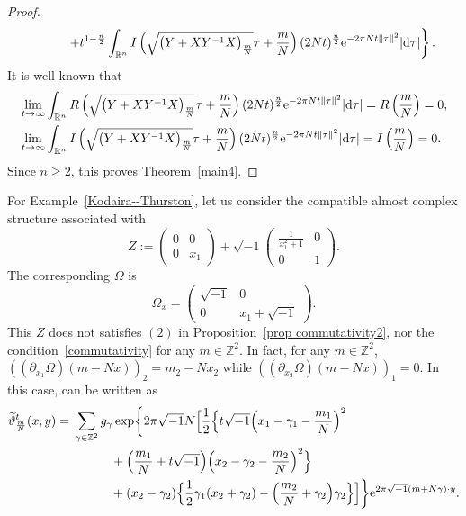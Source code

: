 \documentclass[10pt,a4paper]{amsart}
\numberwithin{equation}{section}
\newcommand{\R}{\mathbb{R}}
\newcommand{\Z}{\mathbb{Z}}
\renewcommand{\tilde}{\widetilde}
\newcommand{\abs}[1]{\lvert#1\rvert}
\newcommand{\norm}[1]{\lVert#1\rVert}
\begin{document}
\begin{proof}
\begin{gather*}
\phantom{\qquad=}{}\left. +t^{1-\frac{n}{2}} \int_{\R^n} I\left(\sqrt{\bigl(Y+XY^{-1}X\bigr)_{\frac{m}{N}}}\tau +\frac{m}{N}\right)(2Nt)^\frac{n}{2} {\rm e}^{-2\pi Nt\norm{\tau}^2}\abs{{\rm d}\tau}\right\}.
\end{gather*}
It is well known that
\begin{align*}
& \lim_{t\to \infty}\int_{\R^n} R\left(\sqrt{\bigl(Y+XY^{-1}X\bigr)_{\frac{m}{N}}}\tau +\frac{m}{N}\right)(2Nt)^\frac{n}{2} {\rm e}^{-2\pi Nt\norm{\tau}^2}\abs{{\rm d}\tau}=R\left(\frac{m}{N}\right)=0, \\
& \lim_{t\to \infty} \int_{\R^n} I\left(\sqrt{\bigl(Y+XY^{-1}X\bigr)_{\frac{m}{N}}}\tau +\frac{m}{N}\right)(2Nt)^\frac{n}{2} {\rm e}^{-2\pi Nt\norm{\tau}^2}\abs{{\rm d}\tau}=I\left(\frac{m}{N}\right)=0.
\end{align*}
Since $n\ge 2$, this proves Theorem~\ref{main4}.
\end{proof}


\begin{Example}%
For Example~\ref{Kodaira--Thurston}, let us consider the compatible almost complex structure associated with
\[
Z:=
\begin{pmatrix}
0 & 0 \\
0 & x_1
\end{pmatrix}
+\sqrt{-1}
\begin{pmatrix}
\frac{1}{x_1^2+1} & 0 \\
0 & 1
\end{pmatrix}.
\]
The corresponding $\Omega$ is
\begin{equation*}
\Omega_x=
\begin{pmatrix}
\sqrt{-1} & 0 \\
0 & x_1+\sqrt{-1}
\end{pmatrix}.
\end{equation*}
This $Z$ does not satisfies $(2)$ in Proposition~\ref{prop commutativity2}, nor
the condition~\eqref{commutativity} for any $m\in \Z^2$. In fact, for any $m\in \Z^2$, $((\partial_{x_1}\Omega)(m-Nx))_2=m_2-Nx_2$ while $((\partial_{x_2}\Omega)(m-Nx))_1=0$. In this case, \smash{${\tilde \vartheta}_{\frac{m}{N}}^t$} can be written as
\begin{align*}
{\tilde \vartheta}_{\frac{m}{N}}^t(x,y)={}&\sum_{\gamma \in \Z^2}g_\gamma \exp\biggl\{2\pi\sqrt{-1}N\Bigl[\frac{1}{2}\Bigl\{t\sqrt{-1}\Bigl(x_1-\gamma_1-\frac{m_1}{N}\Bigl)^2\\
& \hphantom{\sum_{\gamma \in \Z^2}g_\gamma}{}
+\Bigl(\frac{m_1}{N}+t\sqrt{-1}\Bigr)\Bigl(x_2-\gamma_2-\frac{m_2}{N}\Bigr)^2\Bigr\}\\
& \hphantom{\sum_{\gamma \in \Z^2}g_\gamma}{} +(x_2-\gamma_2)\Bigl\{ \frac{1}{2}\gamma_1(x_2+\gamma_2)-\Bigl( \frac{m_2}{N}+\gamma_2\Bigr)\gamma_2\Bigr\}\Bigr]\biggr\}{\rm e}^{2\pi\sqrt{-1}(m+N\gamma)\cdot y}.
\end{align*}
\end{Example}
\end{document}
